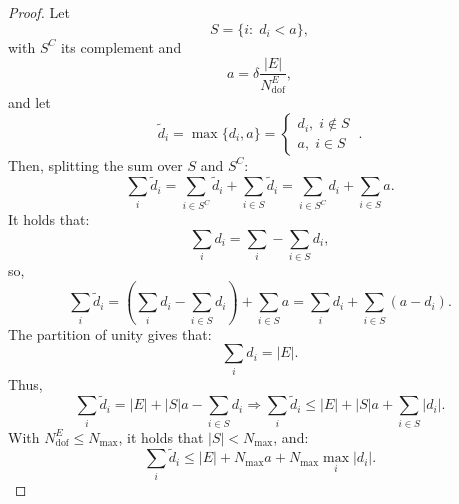 \documentclass{article}
\newcommand{\numdofs}{N^E_{\text{dof}}}
\begin{document}
\begin{proof}
    Let
    \begin{equation}
        \nonumber
        S = \{ i: \; d_i < a \},
    \end{equation}
    with $S^C$ its complement and
    \begin{equation}
        \nonumber
        a = \delta \frac{|E|}{\numdofs},
    \end{equation}
    and let 
    \begin{equation}
        \nonumber
        \tilde{d}_i = \max \{ d_i, a \} = \begin{cases}
            d_i, \; i\notin S \ \\
            a, \; i \in S
        \end{cases}.
    \end{equation}
    Then, splitting the sum over $S$ and $S^C$:
    \begin{equation}
        \nonumber
        \sum \limits_i \tilde{d}_i = \sum \limits_{i \in S^C} \tilde{d}_i + \sum \limits_{i \in S} \tilde{d}_i = \sum \limits_{i \in S^C}d_i + \sum \limits_{i \in S}a.
    \end{equation}
    It holds that:
    \begin{equation}
        \nonumber
        \sum \limits_i d_i = \sum \limits_i - \sum \limits_{i \in S}d_i,
    \end{equation}
    so,
    \begin{equation}
        \nonumber
        \sum \limits_i \tilde{d}_i = \left( \sum \limits_i d_i - \sum \limits_{i \in S} d_i \right) + \sum \limits_{i \in S} a = \sum \limits_i d_i + \sum \limits_{i \in S} (a-d_i).
    \end{equation}
    The partition of unity gives that:
    \begin{equation}
        \nonumber
        \sum \limits_i d_i = |E|.
    \end{equation}
    Thus,
    \begin{equation}
        \nonumber
        \sum \limits_i \tilde{d}_i = |E| + |S|a - \sum \limits_{i \in S} d_i \Rightarrow \sum \limits_i \tilde{d}_i \leq |E| + |S|a + \sum \limits_{i \in S} |d_i|.
    \end{equation}
    With $\numdofs \leq N_{\max}$, it holds that $|S| < N_{\max}$, and:
    \begin{equation}
        \nonumber
        \sum \limits_i \tilde{d}_i \leq |E| + N_{\max} a + N_{\max} \max \limits_i |d_i|.
    \end{equation}


\end{proof}
\end{document}
